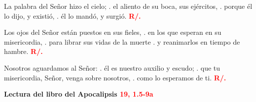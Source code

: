 \documentclass[12pt, letterpaper, spanish]{report}
\begin{document}
\hspace{2cm} La palabra del Se\~nor hizo el cielo; \newline
. \hspace{2.5cm} el aliento de su boca, sus ej\'ercitos, \newline
. \hspace{2.5cm} porque \'el lo dijo, y existi\'o, \newline
. \hspace{2.5cm} \'el lo mand\'o, y surgi\'o. \hspace{1cm} {\bfseries \textcolor{red}{R/.}} \newline

\hspace{2cm} Los ojos del Se\~nor est\'an puestos en sus fieles, \newline
. \hspace{2.5cm}  en los que esperan en su misericordia, \newline
. \hspace{2.5cm}  para librar sus vidas de la muerte \newline
. \hspace{2.5cm}  y reanimarlos en tiempo de hambre. \hspace{1cm} {\bfseries \textcolor{red}{R/.}} \newline

\hspace{2cm} Nosotros aguardamos al Se\~nor: \newline
. \hspace{2.5cm}  \'el es nuestro auxilio y escudo; \newline
. \hspace{2.5cm}  que tu misericordia, Se\~nor, venga sobre nosotros, \newline
. \hspace{2.5cm}  como lo esperamos de ti. \hspace{1cm} {\bfseries \textcolor{red}{R/.}} \newline

\newpage

\Large {\bfseries Lectura del libro del Apocalipsis \hspace{1cm} \textcolor{red}{19, 1.5-9a}} \newline
\end{document}
